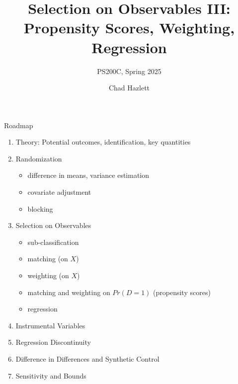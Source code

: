 \documentclass[xcolor=dvipsnames]{beamer}
\title[]{Selection on Observables III: Propensity Scores, Weighting, Regression}
\subtitle[ ]{PS200C, Spring 2025}
\author[Hazlett]{Chad Hazlett }
\institute[UCLA]{UCLA\\[1ex]
  \texttt{chazlett@ucla.edu}
}
\date{}
\begin{document}
\subject{Talks}


\begin{frame}
  \titlepage
\end{frame}


%
%
%

\begin{frame}{Roadmap}
\begin{enumerate}
\item Theory: Potential outcomes, identification, key quantities
\item Randomization
\begin{itemize}
\item difference in means, variance estimation
\item covariate adjustment
\item blocking
\end{itemize}
\item Selection on Observables
\begin{itemize}
\item sub-classification
\item matching (on $X$)
\item weighting (on $X$)
\item matching and weighting on $Pr(D=1)$ (propensity scores)
\item regression 
\end{itemize}
\item Instrumental Variables
\item Regression Discontinuity
\item Difference in Differences and Synthetic Control
\item Sensitivity and Bounds
\end{enumerate}
\end{frame}
\end{document}
